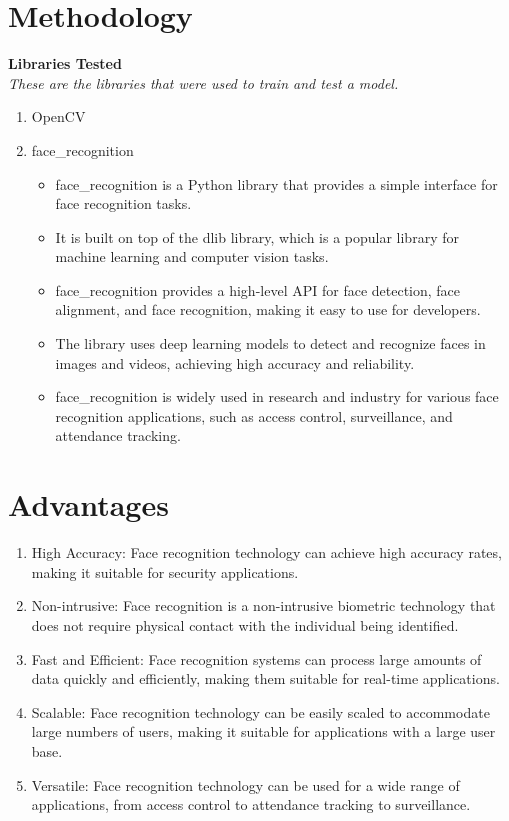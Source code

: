 \documentclass[openany]{report}
\begin{document}
\section{Methodology}
\textbf{Libraries Tested} \\
\textit{These are the libraries that were used to train and test a model.}
\begin{enumerate}
    \item OpenCV
    \item face\_recognition
          \begin{itemize}
              \item face\_recognition is a Python library that provides a simple interface for face recognition tasks.
              \item It is built on top of the dlib library, which is a popular library for machine learning and computer vision tasks.
              \item face\_recognition provides a high-level API for face detection, face alignment, and face recognition, making it easy to use for developers.
              \item The library uses deep learning models to detect and recognize faces in images and videos, achieving high accuracy and reliability.
              \item face\_recognition is widely used in research and industry for various face recognition applications, such as access control, surveillance, and attendance tracking.
          \end{itemize}
\end{enumerate}

\section{Advantages}
\begin{enumerate}
    \item High Accuracy: Face recognition technology can achieve high accuracy rates, making it suitable for security applications.
    \item Non-intrusive: Face recognition is a non-intrusive biometric technology that does not require physical contact with the individual being identified.
    \item Fast and Efficient: Face recognition systems can process large amounts of data quickly and efficiently, making them suitable for real-time applications.
    \item Scalable: Face recognition technology can be easily scaled to accommodate large numbers of users, making it suitable for applications with a large user base.
    \item Versatile: Face recognition technology can be used for a wide range of applications, from access control to attendance tracking to surveillance.
\end{enumerate}
\end{document}
